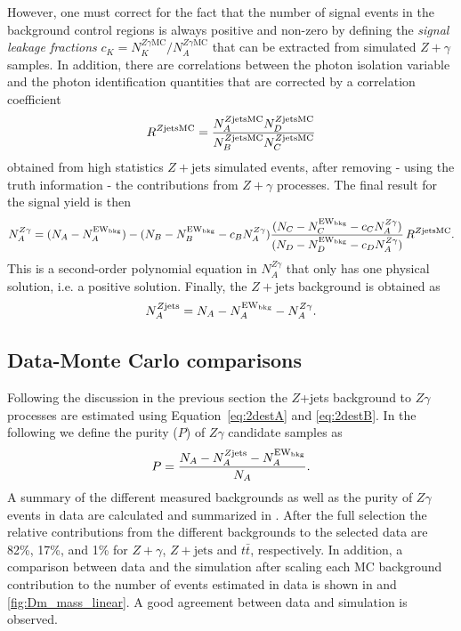 However, one must correct for the fact that the number of signal events in the
background control regions is always positive and non-zero by defining the
\emph{signal leakage fractions} $c_K = N_K^{Z\gamma\text{MC}}/N_A^{Z\gamma\text{MC}}$
that can be extracted from simulated $Z+\gamma$ samples. In addition,
there are correlations between the photon isolation variable and the
photon identification quantities that are corrected by a correlation 
coefficient
\begin{equation} 
    R^{Z\text{jetsMC}} = \frac{N_{A}^{Z\text{jetsMC}} N_{D}^{Z\text{jetsMC}}}{N_{B}^{Z\text{jetsMC}} N_{C}^{Z\text{jetsMC}}}
\end{equation}
obtained from high statistics $Z+\text{jets}$ simulated events, after removing
- using the truth information - the contributions from $Z+\gamma$ processes.
The final result for the signal yield is then
\begin{equation}
   N_{A}^{Z\gamma} = (N_A - N_{A}^{\text{EW$_{\text{bkg}}$}}) - (N_B - N_{B}^{\text{EW$_{\text{bkg}}$}} - c_BN_{A}^{Z\gamma})\frac{(N_C - N_{C}^{\text{EW$_{\text{bkg}}$}} - c_CN_{A}^{Z\gamma})}{(N_D - N_{D}^{\text{EW$_{\text{bkg}}$}} - c_DN_{A}^{Z\gamma})}\,R^{Z\text{jetsMC}}.
\label{eq:2destB}
\end{equation}
This is a second-order polynomial equation in $N_A^{Z\gamma}$ that only has
one physical solution, i.e. a positive solution. Finally, the $Z+\text{jets}$
background is obtained as
\begin{equation}
N_{A}^{Z\text{jets}} = N_A - N_{A}^{\text{EW$_{\text{bkg}}$}} - N_{A}^{Z\gamma}.
\label{eq:2destA}
\end{equation}

\subsection{Data-Monte Carlo comparisons}
Following the discussion in the previous section the $Z$+jets background to
$Z\gamma$ processes are estimated using Equation~\ref{eq:2destA} and \ref{eq:2destB}.
In the following we define the purity ($P$) of $Z\gamma$ candidate samples as
\[
    P = \frac{N_A - N_{A}^{Z\text{jets}} - N_{A}^{\text{EW$_{\text{bkg}}$}}}{N_A}.
\]
A summary of the different measured backgrounds as well as the purity of $Z\gamma$
events in data are calculated and summarized in .
After the full selection the relative contributions from the different backgrounds
to the selected data are 82\%, 17\%, and 1\% for $Z+\gamma$, $Z+\text{jets}$ and
$t\bar t$, respectively.
In addition, a comparison between data and the simulation after scaling each 
MC background contribution to the number of events estimated in data is shown in 
 and \ref{fig:Dm_mass_linear}. 
A good agreement between data and simulation is observed.

